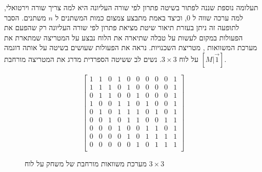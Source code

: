 \documentclass[12pt,leqno]{article}
\theoremstyle{theoremdd}
\begin{document}
תעלומה נוספת שננה לפתור בשיטה פתרון לפי שורה העליונה היא למה צריך שורה וירטואלי, למה ערכה 
שווה ל
$0$,
וכיצד באמת מתבצע צמצום כמות המשתנים ל
$n$
משתנים.
הסבר לתופעה זה
ניתן בעזרת תיאור שיטת מציאת פתרון לפי שורה העליונה רק שהפעם את
הפעולות במקום לעשות על טבלה שתיארה את הלוח נבצע על המטריצה שמתארת את מערכת המשוואות 
,
מטריצת השכנויות.
נראה את הפעולות שעושים בשיטה על אותה דוגמה 
על לוח 
$3 \times 3$.
נשים לב ששיטה הספרדית מדרג את המטריצה מורחבת 
$[M | \vec{1}]$.
\begin{figure}[ht]
    \caption{
        מערכת משוואות מורחבת של משחק על לוח 
        $3 \times 3$
    }
    \label{fig: full matrix 3 x 3}
    \begin{english}
        \begin{center}
            \[\left[
            \begin{array}{ccccccccc|c}
                    1& 1& 0& 1& 0& 0& 0& 0& 0& 1 \\
                    1& 1& 1& 0& 1& 0& 0& 0& 0& 1 \\
                    0& 1& 1& 0& 0& 1& 0& 0& 0& 1 \\
                    1& 0& 0& 1& 1& 0& 1& 0& 0& 1 \\
                    0& 1& 0& 1& 1& 1& 0& 1& 0& 1 \\
                    0& 0& 1& 0& 1& 1& 0& 0& 1& 1 \\
                    0& 0& 0& 1& 0& 0& 1& 1& 0& 1 \\
                    0& 0& 0& 0& 1& 0& 1& 1& 1& 1 \\
                    0& 0& 0& 0& 0& 1& 0& 1& 1& 1 \\
            \end{array}
            \right]\]
        \end{center}
    \end{english}
\end{figure}
\end{document}
